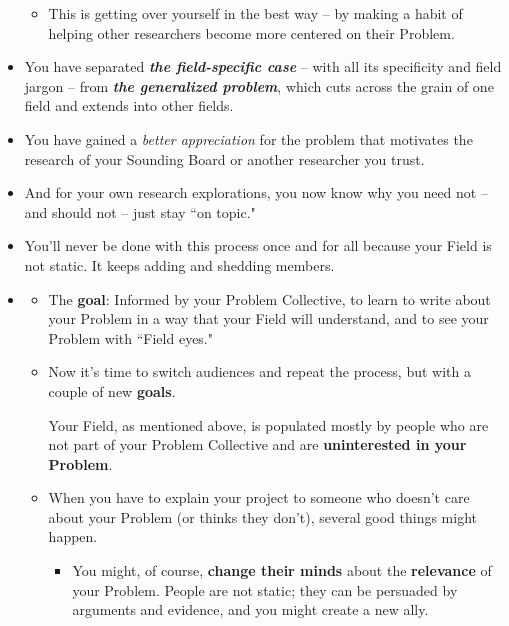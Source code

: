 \documentclass[11pt]{article}
\begin{document}
\begin{itemize}
\begin{exercise}
\begin{itemize}
\item This is getting over yourself in the best way -- by making a habit of helping other researchers become more centered on their Problem.
\end{itemize}
\end{exercise} 

\item You have separated \emph{\textbf{the field-specific case}} -- with all its specificity and field jargon -- from \emph{\textbf{the generalized problem}}, which cuts across the grain of one field and extends into other fields. 

\item You have gained a \emph{better appreciation} for the problem that motivates the research of your Sounding Board or another researcher you trust. 

\item And for your own research explorations, you now know why you need not -- and should not -- just stay ``on topic."

\item You’ll never be done with this process once and for all because your Field is not static. It keeps adding and shedding members. 

\item \begin{exercise}
\begin{itemize}
\item The \textbf{goal}: Informed by your Problem Collective, to learn to write about your Problem in a way that your Field will understand, and to see your Problem with ``Field eyes."

\item Now it’s time to switch audiences and repeat the process, but with a couple of new \textbf{goals}.

Your Field, as mentioned above, is populated mostly by people who are not part of your Problem Collective and are \textbf{uninterested in your Problem}. 

\item When you have to explain your project to someone who doesn’t care about your Problem (or thinks they don’t), several good things might happen. 
\begin{itemize}
\item You might, of course, \textbf{change their minds} about the \textbf{relevance} of your Problem. People are not static; they can be persuaded by
arguments and evidence, and you might create a new ally.


\end{itemize}
\end{itemize}
\end{exercise}
\end{itemize}
\end{document}
